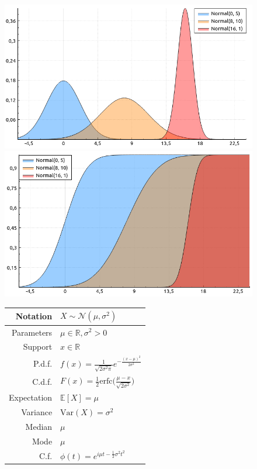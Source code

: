 \documentclass[a4paper,11pt]{article}
\theoremstyle{plain}
\theoremstyle{definition}
\newcommand{\ME}{\mathbb{E}}
\newcommand{\MR}{\mathbb{R}}
\newcommand{\Var}{\mathrm{Var}}
\begin{document}
	\begin{figure}[!htb]\centering
		\begin{minipage}{0.55\textwidth}
			\includegraphics[width=\linewidth, right]{normal_pdf}
			\captionsetup{labelformat=empty}
			\includegraphics[width=\linewidth, right]{normal_cdf}
			\captionsetup{labelformat=empty}
		\end{minipage}
		\begin{minipage}{0.4\textwidth}
		\begin{tabular}{| r | l |}
			\hline
			Notation & $X \sim \mathcal{N}(\mu, \sigma^2)$ \\
			\hline
			Parameters & $\mu \in \MR, \sigma^2 > 0 $ \\
			\hline
			Support & $x \in \MR$  \\
			\hline
			P.d.f. & $f(x)= \frac{1}{\sqrt{2\sigma^2\pi}}e^{-\frac{(x-\mu)^2}{2\sigma^2}}  $ \\
			\hline
			C.d.f. & $F(x)= \frac{1}{2} \mathrm{erfc}\Big( \frac{\mu-x}{\sqrt{2\sigma^2}} \Big) $ \\
			\hline
			Expectation & $\ME[X] = \mu$ \\
			\hline
			Variance & $\Var(X) = \sigma^2$\\
			\hline
			Median & $\mu$ \\
			\hline
			Mode & $\mu$ \\
			\hline
			C.f. & $\phi(t) = e^{i\mu t - \frac{1}{2}\sigma^2t^2}  $ \\
			\hline
		\end{tabular}
    	\end{minipage}
	\end{figure}
\end{document}
